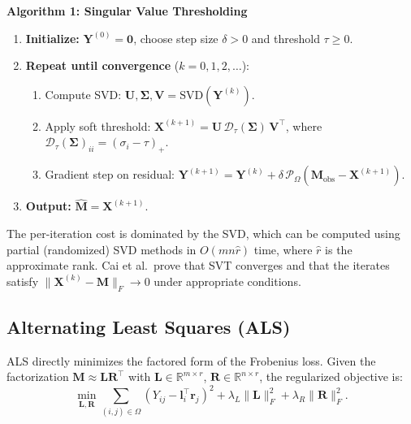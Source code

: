 \documentclass[conference]{IEEEtran}
\begin{document}
\textbf{Algorithm 1: Singular Value Thresholding}
\begin{enumerate}
  \item \textbf{Initialize:} $\mathbf{Y}^{(0)} = \mathbf{0}$, choose step size $\delta > 0$ and threshold $\tau \geq 0$.
  \item \textbf{Repeat until convergence} ($k = 0, 1, 2, \ldots$):
    \begin{enumerate}
      \item Compute SVD: $\mathbf{U}, \boldsymbol{\Sigma}, \mathbf{V} = \mathrm{SVD}(\mathbf{Y}^{(k)})$.
      \item Apply soft threshold: $\mathbf{X}^{(k+1)} = \mathbf{U}\,\mathcal{D}_\tau(\boldsymbol{\Sigma})\,\mathbf{V}^\top$, where $\mathcal{D}_\tau(\boldsymbol{\Sigma})_{ii} = (\sigma_i - \tau)_+$.
      \item Gradient step on residual: $\mathbf{Y}^{(k+1)} = \mathbf{Y}^{(k)} + \delta\,\mathcal{P}_\Omega(\mathbf{M}_\mathrm{obs} - \mathbf{X}^{(k+1)})$.
    \end{enumerate}
  \item \textbf{Output:} $\hat{\mathbf{M}} = \mathbf{X}^{(k+1)}$.
\end{enumerate}

The per-iteration cost is dominated by the SVD, which can be computed using partial (randomized) SVD methods in $O(mn\hat{r})$ time, where $\hat{r}$ is the approximate rank. Cai et al.\ prove that SVT converges and that the iterates satisfy $\|\mathbf{X}^{(k)} - \mathbf{M}\|_F \to 0$ under appropriate conditions.

\subsection{Alternating Least Squares (ALS)}

ALS \cite{jain2013low} directly minimizes the factored form of the Frobenius loss. Given the factorization $\mathbf{M} \approx \mathbf{L}\mathbf{R}^\top$ with $\mathbf{L} \in \mathbb{R}^{m \times r}$, $\mathbf{R} \in \mathbb{R}^{n \times r}$, the regularized objective is:
\begin{equation}
  \min_{\mathbf{L},\mathbf{R}} \sum_{(i,j)\in\Omega} (Y_{ij} - \mathbf{l}_i^\top \mathbf{r}_j)^2 + \lambda_L \|\mathbf{L}\|_F^2 + \lambda_R \|\mathbf{R}\|_F^2.
  \label{eq:als_obj}
\end{equation}
\end{document}
